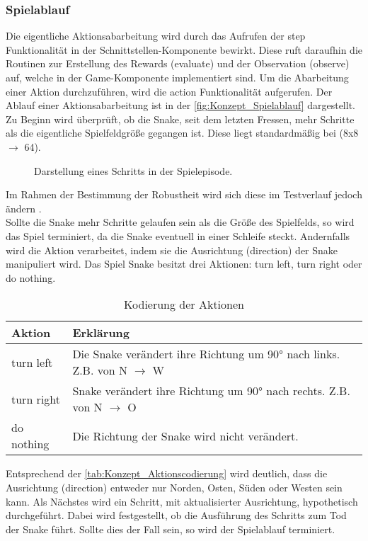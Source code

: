 \subsubsection{Spielablauf} \label{subsubsec:Konzept_Spielablauf}
Die eigentliche Aktionsabarbeitung wird durch das Aufrufen der step Funktionalität in der Schnittstellen-Komponente  bewirkt. Diese ruft daraufhin die Routinen zur Erstellung des Rewards (evaluate) und der Observation (observe) auf, welche in der Game-Komponente implementiert sind.
Um die Abarbeitung einer Aktion durchzuführen, wird die action Funktionalität aufgerufen. Der Ablauf einer Aktionsabarbeitung ist in der \autoref{fig:Konzept_Spielablauf} dargestellt. Zu Beginn wird überprüft, ob die Snake, seit dem letzten Fressen, mehr Schritte als die eigentliche Spielfeldgröße gegangen ist. Diese liegt standardmäßig bei (8x8 $\longrightarrow$ 64).
\begin{figure}[H]
	\centering
	
	\caption[Spielablauf]{Darstellung eines Schritts in der Spielepisode.}
	\label{fig:Konzept_Spielablauf}
\end{figure}
Im Rahmen der Bestimmung der Robustheit wird sich diese im Testverlauf jedoch ändern .\\
Sollte die Snake mehr Schritte gelaufen sein als die Größe des Spielfelds, so wird das Spiel terminiert, da die Snake eventuell in einer Schleife steckt.
Andernfalls wird die Aktion verarbeitet, indem sie die Ausrichtung (direction) der Snake manipuliert wird. Das Spiel Snake besitzt drei Aktionen: turn left, turn right oder do nothing.
\begin{longtable}[h]{|p{3cm}|p{\linewidth - 4cm}|}
	\caption{Kodierung der Aktionen}
	\label{tab:Konzept_Aktionscodierung} 
	\endfirsthead
	\endhead
	\hline
	Aktion & Erklärung \\
	\hline
	turn left & Die Snake verändert ihre Richtung um 90° nach links. Z.B. von N $\longrightarrow$ W \\
	\hline
	turn right & Snake verändert ihre Richtung um 90° nach rechts. Z.B. von N $\longrightarrow$ O \\
	\hline
	do nothing & Die Richtung der Snake wird nicht verändert. \\
	\hline
\end{longtable}
Entsprechend der \autoref{tab:Konzept_Aktionscodierung} wird deutlich, dass die Ausrichtung (direction) entweder nur Norden, Osten, Süden oder Westen sein kann.
Als Nächstes wird ein Schritt, mit aktualisierter Ausrichtung, hypothetisch durchgeführt. Dabei wird festgestellt, ob die Ausführung des Schritts zum Tod der Snake führt. Sollte dies der Fall sein, so wird der Spielablauf terminiert.
